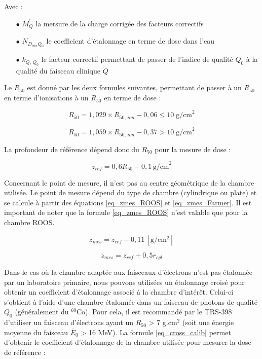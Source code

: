\documentclass{article}
\begin{document}
Avec :
\begin{itemize}
  \item[$\bullet$] $M_Q^{'}$ la mersure de la charge corrigée des facteurs correctifs
  \item[$\bullet$] $N_{D_{eau} Q_0}$ le coefficient d'étalonnage en terme de dose dans l'eau
  \item[$\bullet$] $k_{Q,\, Q_0}$ le facteur correctif permettant de passer de l'indice de qualité $Q_0$ à la qualité du faisceau clinique $Q$
\end{itemize}

Le $R_{50}$ est donné par les deux formules suivantes, permettant de passer à un $R_{50}$ en terme d'ionisations à un $R_{50}$ en terme de dose :

\begin{equation}
  R_{50} = 1,029 \times R_{50,\, ion} - 0,06 \leq 10\; \text{g/cm}^2
\end{equation}

\begin{equation}
  R_{50} = 1,059 \times R_{50,\, ion} - 0,37 > 10\; \text{g/cm}^2
\end{equation}

La profondeur de référence dépend donc du $R_{50}$ pour la mesure de dose :

\begin{equation}
  z_{ref} = 0,6 R_{50} - 0,1 \, \text{g/cm}^2
\end{equation}

Concernant le point de mesure, il n'est pas au centre géométrique de la chambre utilisée. Le point de mesure dépend du type de chambre (cylindrique ou plate) et se calcule à partir des équations \ref*{eq_zmes_ROOS} et \ref*{eq_zmes_Farmer}. Il est important de noter que la formule \ref*{eq_zmes_ROOS} n'est valable que pour la chambre ROOS.

\begin{equation}
  z_{mes} = z_{ref} - 0,11 \, [\text{g/cm$^2$}]
  \label{eq_zmes_ROOS}
\end{equation}

\begin{equation}
  z_{mes} = z_{ref} + 0,5 r_{cyl}
  \label{eq_zmes_Farmer}
\end{equation}

Dans le cas où la chambre adaptée aux faisceaux d'électrons n'est pas étalonnée par un laboratoire primaire, nous pouvons utilisées un étalonnage croisé pour obtenir un coefficient d'étalonnage associé à la chambre d'intérêt. Celui-ci s'obtient à l'aide d'une chambre étalonnée dans un faisceau de photons de qualité $Q_0$ (généralement du $^{60}$Co). Pour cela, il est recommandé par le TRS-398 d'utiliser un faisceau d'électrons ayant un $R_{50}$ > 7 g.cm$^2$ (soit une énergie moyenne du faisceau $\overline{E}_0$ > 16 MeV). La formule \ref*{eq_cross_calib} permet d'obtenir le coefficient d'étalonnage de la chambre utilisée pour mesurer la dose de référence :
\end{document}
